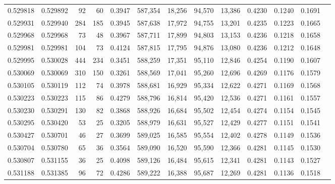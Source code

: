 \begin{tabular}{rrrrrrrrrrrrr}
0.529818 & 0.529892 &    92 &    60 &                                     0.3947 & 587,354 &  18,256 &  94,570 &  13,386 & 0.4230 & 0.1240 & 0.1691 \\
0.529931 & 0.529940 &   284 &   185 &                                     0.3945 & 587,638 &  17,972 &  94,755 &  13,201 & 0.4235 & 0.1223 & 0.1665 \\
0.529968 & 0.529968 &    73 &    48 &                                     0.3967 & 587,711 &  17,899 &  94,803 &  13,153 & 0.4236 & 0.1218 & 0.1658 \\
0.529981 & 0.529981 &   104 &    73 &                                     0.4124 & 587,815 &  17,795 &  94,876 &  13,080 & 0.4236 & 0.1212 & 0.1648 \\
0.529995 & 0.530028 &   444 &   234 &                                     0.3451 & 588,259 &  17,351 &  95,110 &  12,846 & 0.4254 & 0.1190 & 0.1607 \\
0.530069 & 0.530069 &   310 &   150 &                                     0.3261 & 588,569 &  17,041 &  95,260 &  12,696 & 0.4269 & 0.1176 & 0.1579 \\
0.530105 & 0.530119 &   112 &    74 &                                     0.3978 & 588,681 &  16,929 &  95,334 &  12,622 & 0.4271 & 0.1169 & 0.1568 \\
0.530223 & 0.530223 &   115 &    86 &                                     0.4279 & 588,796 &  16,814 &  95,420 &  12,536 & 0.4271 & 0.1161 & 0.1557 \\
0.530230 & 0.530291 &   130 &    82 &                                     0.3868 & 588,926 &  16,684 &  95,502 &  12,454 & 0.4274 & 0.1154 & 0.1545 \\
0.530295 & 0.530420 &    53 &    25 &                                     0.3205 & 588,979 &  16,631 &  95,527 &  12,429 & 0.4277 & 0.1151 & 0.1541 \\
0.530427 & 0.530701 &    46 &    27 &                                     0.3699 & 589,025 &  16,585 &  95,554 &  12,402 & 0.4278 & 0.1149 & 0.1536 \\
0.530704 & 0.530780 &    65 &    36 &                                     0.3564 & 589,090 &  16,520 &  95,590 &  12,366 & 0.4281 & 0.1145 & 0.1530 \\
0.530807 & 0.531155 &    36 &    25 &                                     0.4098 & 589,126 &  16,484 &  95,615 &  12,341 & 0.4281 & 0.1143 & 0.1527 \\
0.531188 & 0.531385 &    96 &    72 &                                     0.4286 & 589,222 &  16,388 &  95,687 &  12,269 & 0.4281 & 0.1136 & 0.1518 \\

\end{tabular}
